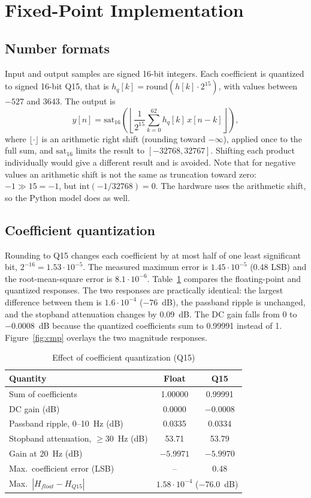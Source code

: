 \documentclass{ieeeaccess}
\begin{document}
\section{Fixed-Point Implementation}
\label{sec:fixed}
\subsection{Number formats}
Input and output samples are signed 16-bit integers. Each coefficient is quantized to signed 16-bit Q15, that is $h_q[k] = \mathrm{round}(h[k]\cdot 2^{15})$, with values between $-527$ and $3643$. The output is
\begin{equation}
y[n] = \mathrm{sat}_{16}\!\left(\left\lfloor \frac{1}{2^{15}} \sum_{k=0}^{62} h_q[k]\,x[n-k] \right\rfloor\right),
\end{equation}
where $\lfloor\cdot\rfloor$ is an arithmetic right shift (rounding toward $-\infty$), applied once to the full sum, and $\mathrm{sat}_{16}$ limits the result to $[-32768, 32767]$. Shifting each product individually would give a different result and is avoided. Note that for negative values an arithmetic shift is not the same as truncation toward zero: $-1 \gg 15 = -1$, but $\mathrm{int}(-1/32768) = 0$. The hardware uses the arithmetic shift, so the Python model does as well.

\subsection{Coefficient quantization}
Rounding to Q15 changes each coefficient by at most half of one least significant bit, $2^{-16} = 1.53\cdot10^{-5}$. The measured maximum error is $1.45\cdot10^{-5}$ (0.48 LSB) and the root-mean-square error is $8.1\cdot10^{-6}$. Table~\ref{tab:quant} compares the floating-point and quantized responses. The two responses are practically identical: the largest difference between them is $1.6\cdot10^{-4}$ ($-76$~dB), the passband ripple is unchanged, and the stopband attenuation changes by 0.09~dB. The DC gain falls from 0 to $-0.0008$~dB because the quantized coefficients sum to 0.99991 instead of 1. Figure~\ref{fig:cmp} overlays the two magnitude responses.

\begin{table}[!t]
\caption{Effect of coefficient quantization (Q15)}
\label{tab:quant}
\centering
\begin{tabular}{lcc}
\toprule
Quantity & Float & Q15 \\
\midrule
Sum of coefficients & 1.00000 & 0.99991 \\
DC gain (dB) & 0.0000 & $-0.0008$ \\
Passband ripple, 0--10~Hz (dB) & 0.0335 & 0.0334 \\
Stopband attenuation, $\ge$30~Hz (dB) & 53.71 & 53.79 \\
Gain at 20~Hz (dB) & $-5.9971$ & $-5.9970$ \\
Max.\ coefficient error (LSB) & -- & 0.48 \\
Max.\ $|H_{float}-H_{Q15}|$ & \multicolumn{2}{c}{$1.58\cdot10^{-4}$ ($-76.0$~dB)} \\
\bottomrule
\end{tabular}
\end{table}
\end{document}
